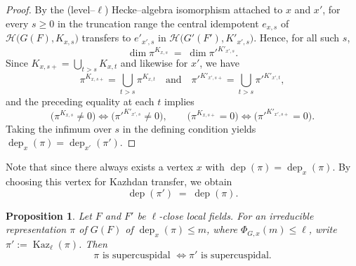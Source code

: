 \documentclass[american]{article}
\numberwithin{equation}{section}
\numberwithin{figure}{section}
\theoremstyle{plain}
\newtheorem{proposition}[theorem]{Proposition}
\theoremstyle{definition}
\theoremstyle{remark}
\DeclareMathOperator{\dep}{dep}
\DeclareMathOperator{\Kaz}{Kaz}
\newcommand{\cH}{\mathcal{H}}
\begin{document}
\begin{proof}
By the (level--$\ell$) Hecke--algebra isomorphism attached to $x$ and $x'$, for every $s\ge 0$
in the truncation range the central idempotent $e_{x,s}$ of $\cH\!\bigl(G(F),K_{x,s}\bigr)$
transfers to $e'_{x',s}$ in $\cH\!\bigl(G'(F'),K'_{x',s}\bigr)$.
Hence, for all such $s$,
\begin{equation*}
   \dim \pi^{K_{x,s}} \;=\; \dim \pi'^{K'_{x',s}}.
\end{equation*}
Since $K_{x,s+}=\bigcup_{t>s}K_{x,t}$ and likewise for $x'$, we have
\[
   \pi^{K_{x,s+}}=\bigcup_{t>s}\pi^{K_{x,t}}
   \quad\text{and}\quad
   \pi'^{K'_{x',s+}}=\bigcup_{t>s}\pi'^{K'_{x',t}},
\]
and the preceding equality at each $t$ implies
\[
   \bigl(\pi^{K_{x,s}}\neq 0\bigr)\iff\bigl(\pi'^{K'_{x',s}}\neq 0\bigr),
   \qquad
   \bigl(\pi^{K_{x,s+}}=0\bigr)\iff\bigl(\pi'^{K'_{x',s+}}=0\bigr).
\]
Taking the infimum over $s$ in the defining condition yields
$\dep_{x}(\pi)=\dep_{x'}(\pi')$.
\end{proof}
Note that since there always exists a vertex $x$ with $\dep(\pi)=\dep_{x}(\pi)$. By choosing this vertex for Kazhdan transfer, we obtain
\[
   \dep(\pi')\;=\;\dep(\pi).
\]

\begin{proposition}
\label{prop:Kaz-preserves-SC}
Let $F$ and $F'$ be $\ell$-close local fields. For an irreducible representation $\pi$ of $G(F)$ of \(\dep_x(\pi)\leq m\), where \(\Phi_{G,x}(m)\leq \ell\), write $\pi':=\Kaz_{\ell}(\pi)$. Then
\[
     \pi \text{ is supercuspidal } \Longleftrightarrow \pi' \text{ is supercuspidal}.
\]
\end{proposition}
\end{document}
